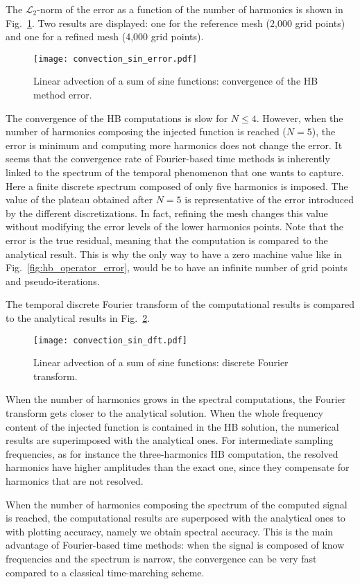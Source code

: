 The $\mathcal{L}_2$-norm of the error as a function of the number of harmonics
is shown in Fig.~\ref{fig:conv_sum_sine}. Two results are displayed:
one for the reference mesh (2,000 grid points) and one for
a refined mesh (4,000 grid points).
\begin{figure}[htb]
  \centering
  \texttt{[image: convection\_sin\_error.pdf]}
  \caption{Linear advection of a sum of sine functions: convergence of the HB method error.}
  \label{fig:conv_sum_sine}
\end{figure}
The convergence of the HB computations is slow  for
$N \leq 4$. However, when the number of harmonics composing
the injected function is reached ($N=5$), the error is minimum and computing
more harmonics does not change the error.
It seems that the convergence rate 
of Fourier-based time methods is inherently linked to the spectrum of the
temporal phenomenon that one wants to capture. Here a finite discrete spectrum composed of only five harmonics
is imposed.
The value of the plateau obtained 
after $N=5$ is representative of the error introduced by the different
discretizations. In fact, refining the mesh changes this value
without modifying the error levels of the lower harmonics points.
Note that the error is the true residual, meaning
that the computation is compared to the analytical result.
This is why the only way to have a zero machine value like in
Fig.~\ref{fig:hb_operator_error}, 
would be to have an infinite number of grid points and
pseudo-iterations.

The temporal discrete Fourier transform
of the computational results is compared to the
analytical results in Fig.~\ref{fig:dft_sin}.
\begin{figure}[htb]
  \centering
  \texttt{[image: convection\_sin\_dft.pdf]}
  \caption{Linear advection of a sum of sine functions: 
  discrete Fourier transform.}
  \label{fig:dft_sin}
\end{figure}
When the number of harmonics grows in the spectral computations,
the Fourier transform gets closer to the analytical solution.
When the whole frequency content of the injected 
function is contained in the HB solution, 
the numerical results are superimposed with the analytical ones.
For intermediate sampling frequencies, as for 
instance the three-harmonics HB computation, 
the resolved harmonics have higher amplitudes 
than the exact one, since they compensate for harmonics that are not resolved.

When the number of harmonics composing the spectrum of the
computed signal is reached, the computational results are superposed
with the analytical ones to with plotting accuracy, namely we obtain spectral accuracy.
This is the main advantage of Fourier-based time methods: when the
signal is composed of know frequencies and the spectrum is narrow, the
convergence can be very fast compared to a classical time-marching scheme.

\FloatBarrier

